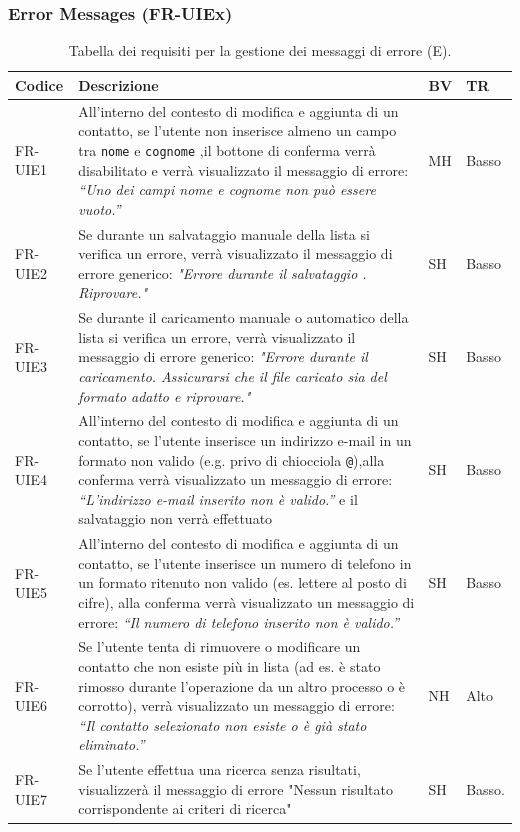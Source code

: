 \documentclass[a4paper,12pt]{article}
\begin{document}
    \subsubsection{Error Messages (FR-UIEx)}
    \begin{table}[H]
        \centering
        \begin{tabular}{|l|p{8cm}|l|l|}
            \hline
            \textbf{Codice} & \textbf{Descrizione} & \textbf{BV} & \textbf{TR} \\
            \hline
            FR-UIE1 &
            All'interno del contesto di modifica e aggiunta di un contatto,
            se l'utente non inserisce almeno un campo tra \texttt{nome} e \texttt{cognome}
            ,il bottone di conferma verrà disabilitato e  verrà visualizzato il messaggio di errore:
            \textit{“Uno dei campi nome e cognome non può essere vuoto.”} & MH & Basso \\
            \hline
            FR-UIE2 & Se durante un salvataggio manuale della lista si verifica un errore, verrà visualizzato il messaggio di errore generico: \textit {"Errore durante il salvataggio . Riprovare."} & SH & Basso \\ \hline
            FR-UIE3 & Se durante il caricamento manuale o automatico della lista si verifica un errore, verrà visualizzato il messaggio di errore generico:\textit{ "Errore durante il caricamento. Assicurarsi che il file caricato sia del formato adatto e riprovare." }& SH & Basso \\ \hline
            FR-UIE4 &
            All'interno del contesto di modifica e aggiunta di un contatto, se l'utente inserisce un indirizzo e-mail in un formato non valido
            (e.g. privo di chiocciola \texttt{@}),alla conferma verrà visualizzato un messaggio di errore:
            \textit{“L’indirizzo e-mail inserito non è valido.”} e il salvataggio non verrà effettuato & SH & Basso \\
            \hline

            FR-UIE5 &
            All'interno del contesto di modifica e aggiunta di un contatto, se l'utente inserisce un numero di telefono in un formato ritenuto non valido
            (es. lettere al posto di cifre), alla conferma verrà visualizzato un messaggio di errore:
            \textit{“Il numero di telefono inserito non è valido.”} & SH & Basso \\
            \hline
            FR-UIE6 &
            Se l'utente tenta di rimuovere o modificare un contatto che non esiste più in lista
            (ad es. è stato rimosso durante l’operazione da un altro processo o è corrotto),
            verrà visualizzato un messaggio di errore:
            \textit{“Il contatto selezionato non esiste o è già stato eliminato.”} & NH & Alto \\
            \hline
            FR-UIE7 & Se l'utente effettua una ricerca senza risultati, visualizzerà il messaggio di errore "Nessun risultato corrispondente ai criteri di ricerca" & SH & Basso. \\ \hline
        \end{tabular}
        \caption{Tabella dei requisiti per la gestione dei messaggi di errore (E).}
    \end{table}
\end{document}
